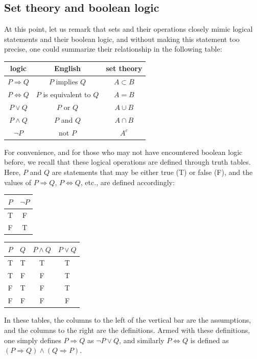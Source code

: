 \subsection{Set theory and boolean logic}
At this point, let us remark that sets and their operations closely mimic logical statements and their boolean logic, and without making this statement too precise, one could summarize their relationship in the following table:

\begin{center}
\begin{tabular}{ccc}
  logic & English & set theory \\
  \hline
  $P \Rightarrow Q$ & $P$ implies $Q$ & $A \subset B$ \\
  $P \Leftrightarrow Q$ & $P$ is equivalent to $Q$ & $A = B$ \\
  $P \vee Q$ & $P$ or $Q$ & $A \cup B$ \\
  $P \wedge Q$ & $P$ and $Q$ & $A\cap B$ \\
  $\neg P$ & not $P$ & $A^c$
\end{tabular}
\end{center}

For convenience, and for those who may not have encountered boolean logic before, we recall that these logical operations are defined through truth tables. Here, $P$ and $Q$ are statements that may be either true (T) or false (F), and the values of $P \Rightarrow Q$, $P \Leftrightarrow Q$, etc., are defined accordingly:
\begin{center}
\begin{tabular}{c|c}
  $P$ & $\neg P$ \\
  \hline
  T & F \\
  F & T
\end{tabular}
\quad \quad
\begin{tabular}{cc|cc}
  $P$ & $Q$ & $P \wedge Q$ & $P \vee Q$ \\
  \hline
  T & T & T & T \\
  T & F & F & T \\
  F & T & F & T \\
  F & F & F & F
\end{tabular}
\end{center}

In these tables, the columns to the left of the vertical bar are the assumptions, and the columns to the right are the definitions. Armed with these definitions, one simply defines $P \Rightarrow Q$ as $\neg P \vee Q$, and similarly $P \Leftrightarrow Q$ is defined as $(P \Rightarrow Q) \wedge (Q \Rightarrow P)$.

